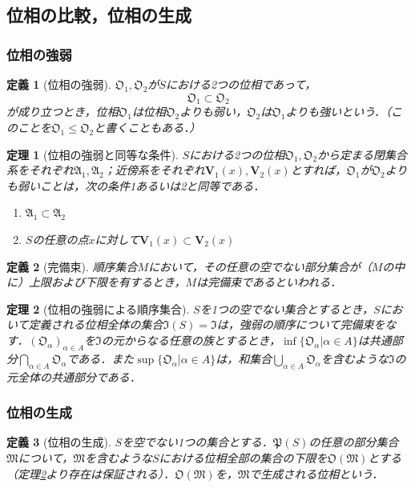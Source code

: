 \documentclass[a4paper,10pt,uplatex]{jsarticle}
\numberwithin{equation}{section}
\theoremstyle{mystyle}
\newtheorem{dfn}{定義}[section]
\newtheorem{thm}{定理}[section]
\newcommand{\gA}{\mathfrak{A}}
\newcommand{\gI}{\mathfrak{I}}
\newcommand{\gM}{\mathfrak{M}}
\newcommand{\gO}{\mathfrak{O}}
\newcommand{\gP}{\mathfrak{P}}
\begin{document}
\subsection{位相の比較，位相の生成}
\subsubsection{位相の強弱}
\begin{dfn}[位相の強弱]
    $\gO_1, \gO_2$が$S$における2つの位相であって，
    \begin{equation}
        \gO_1 \subset \gO_2
    \end{equation}
    が成り立つとき，位相$\gO_1$は位相$\gO_2$よりも弱い，$\gO_2$は$\gO_1$よりも強いという．（このことを$\gO_1 \leq \gO_2$と書くこともある．）
\end{dfn}

\begin{thm}[位相の強弱と同等な条件]
    $S$における2つの位相$\gO_1, \gO_2$から定まる閉集合系をそれぞれ$\gA_1,\gA_2$；近傍系をそれぞれ$\bm{V}_1(x), \bm{V}_2(x)$とすれば，$\gO_1$が$\gO_2$よりも弱いことは，次の条件1あるいは2と同等である．
    \begin{enumerate}
        \item $\gA_1 \subset \gA_2$
        \item $S$の任意の点$x$に対して$\bm{V}_1(x) \subset \bm{V}_2(x)$
    \end{enumerate}
\end{thm}

\begin{dfn}[完備束] 
    順序集合$M$において，その任意の空でない部分集合が（$M$の中に）上限および下限を有するとき，$M$は完備束であるといわれる．
\end{dfn}

\begin{thm}[位相の強弱による順序集合] \label{thm:位相の強弱による順序集合}
    $S$を1つの空でない集合とするとき，$S$において定義される位相全体の集合$\gI(S)=\gI$は，強弱の順序について完備束をなす．$(\gO_\alpha)_{\alpha\in A}$を$\gI$の元からなる任意の族とするとき，$\inf\{\gO_\alpha | \alpha \in A\}$は共通部分$\bigcap_{\alpha \in A}\gO_\alpha$である．また$\sup\{\gO_\alpha | \alpha \in A\}$は，和集合$\bigcup_{\alpha \in A}\gO_\alpha$を含むような$\gI$の元全体の共通部分である．
\end{thm}

\subsubsection{位相の生成}
\begin{dfn}[位相の生成]
    $S$を空でない1つの集合とする．$\gP(S)$の任意の部分集合$\gM$について，$\gM$を含むような$S$における位相全部の集合の下限を$\gO(\gM)$とする（定理\ref{thm:位相の強弱による順序集合}より存在は保証される）．$\gO(\gM)$を，$\gM$で生成される位相という．
\end{dfn}
\end{document}
